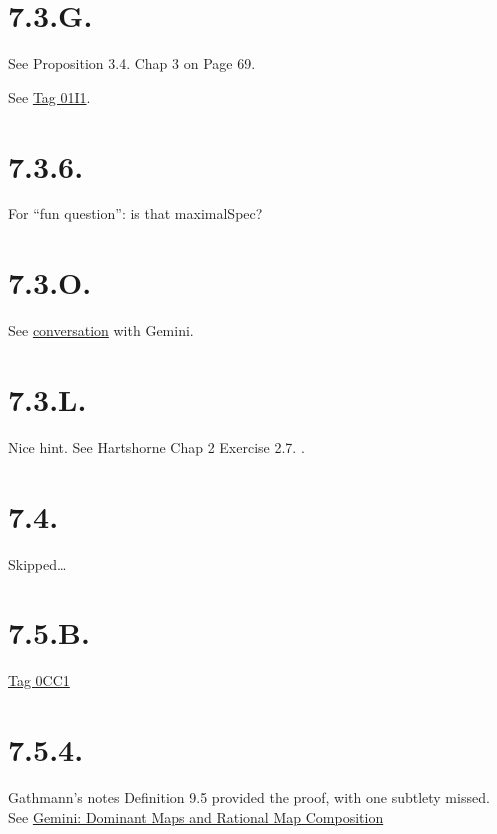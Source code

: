 \section{7.3.G.}

See \cite{gortz2020algebraic} Proposition 3.4. Chap 3 on Page 69.

See \href{https://stacks.math.columbia.edu/tag/01I1}{Tag 01I1}.
\section{7.3.6.}

For \enquote{fun question}: is that maximalSpec?
\section{7.3.O.}
See \href{https://gemini.google.com/share/b1e4a38864db}{conversation} with Gemini.

\section{7.3.L.}

Nice hint. See Hartshorne Chap 2 Exercise 2.7. \cite{hartshorne2013algebraic}.

\section{7.4.}

Skipped\dots

\section{7.5.B.}

\href{https://stacks.math.columbia.edu/tag/0CC1}{Tag 0CC1}

\section{7.5.4.}

Gathmann's notes Definition 9.5 provided the proof, with one subtlety missed.
See \href{https://gemini.google.com/share/99bbf881ad18}{Gemini: Dominant Maps and Rational Map Composition}


